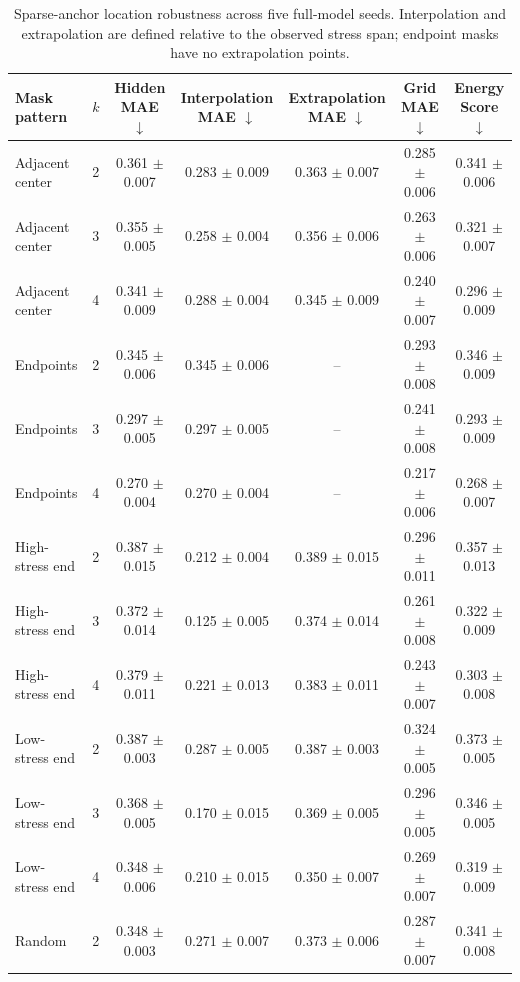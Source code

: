 \begin{table}[t]
\caption{Sparse-anchor location robustness across five full-model seeds. Interpolation and extrapolation are defined relative to the observed stress span; endpoint masks have no extrapolation points.}
\label{tab:mask_robustness}
\centering\scriptsize\setlength{\tabcolsep}{4pt}
\begin{tabular}{lcccccc}
\toprule
Mask pattern & $k$ & Hidden MAE $\downarrow$ & Interpolation MAE $\downarrow$ & Extrapolation MAE $\downarrow$ & Grid MAE $\downarrow$ & Energy Score $\downarrow$ \\
\midrule
Adjacent center & 2 & 0.361 $\pm$ 0.007 & 0.283 $\pm$ 0.009 & 0.363 $\pm$ 0.007 & 0.285 $\pm$ 0.006 & 0.341 $\pm$ 0.006 \\
Adjacent center & 3 & 0.355 $\pm$ 0.005 & 0.258 $\pm$ 0.004 & 0.356 $\pm$ 0.006 & 0.263 $\pm$ 0.006 & 0.321 $\pm$ 0.007 \\
Adjacent center & 4 & 0.341 $\pm$ 0.009 & 0.288 $\pm$ 0.004 & 0.345 $\pm$ 0.009 & 0.240 $\pm$ 0.007 & 0.296 $\pm$ 0.009 \\
Endpoints & 2 & 0.345 $\pm$ 0.006 & 0.345 $\pm$ 0.006 & -- & 0.293 $\pm$ 0.008 & 0.346 $\pm$ 0.009 \\
Endpoints & 3 & 0.297 $\pm$ 0.005 & 0.297 $\pm$ 0.005 & -- & 0.241 $\pm$ 0.008 & 0.293 $\pm$ 0.009 \\
Endpoints & 4 & 0.270 $\pm$ 0.004 & 0.270 $\pm$ 0.004 & -- & 0.217 $\pm$ 0.006 & 0.268 $\pm$ 0.007 \\
High-stress end & 2 & 0.387 $\pm$ 0.015 & 0.212 $\pm$ 0.004 & 0.389 $\pm$ 0.015 & 0.296 $\pm$ 0.011 & 0.357 $\pm$ 0.013 \\
High-stress end & 3 & 0.372 $\pm$ 0.014 & 0.125 $\pm$ 0.005 & 0.374 $\pm$ 0.014 & 0.261 $\pm$ 0.008 & 0.322 $\pm$ 0.009 \\
High-stress end & 4 & 0.379 $\pm$ 0.011 & 0.221 $\pm$ 0.013 & 0.383 $\pm$ 0.011 & 0.243 $\pm$ 0.007 & 0.303 $\pm$ 0.008 \\
Low-stress end & 2 & 0.387 $\pm$ 0.003 & 0.287 $\pm$ 0.005 & 0.387 $\pm$ 0.003 & 0.324 $\pm$ 0.005 & 0.373 $\pm$ 0.005 \\
Low-stress end & 3 & 0.368 $\pm$ 0.005 & 0.170 $\pm$ 0.015 & 0.369 $\pm$ 0.005 & 0.296 $\pm$ 0.005 & 0.346 $\pm$ 0.005 \\
Low-stress end & 4 & 0.348 $\pm$ 0.006 & 0.210 $\pm$ 0.015 & 0.350 $\pm$ 0.007 & 0.269 $\pm$ 0.007 & 0.319 $\pm$ 0.009 \\
Random & 2 & 0.348 $\pm$ 0.003 & 0.271 $\pm$ 0.007 & 0.373 $\pm$ 0.006 & 0.287 $\pm$ 0.007 & 0.341 $\pm$ 0.008 \\

\end{tabular}
\end{table}
